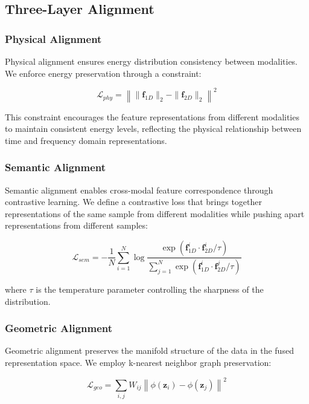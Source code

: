 \documentclass[journal]{IEEEtran}
\begin{document}
\subsection{Three-Layer Alignment}

\subsubsection{Physical Alignment}

Physical alignment ensures energy distribution consistency between modalities. We enforce energy preservation through a constraint:

\begin{equation}
\mathcal{L}_{phy} = \left\| \|\mathbf{f}_{1D}\|_2 - \|\mathbf{f}_{2D}\|_2 \right\|^2
\end{equation}

This constraint encourages the feature representations from different modalities to maintain consistent energy levels, reflecting the physical relationship between time and frequency domain representations.

\subsubsection{Semantic Alignment}

Semantic alignment enables cross-modal feature correspondence through contrastive learning. We define a contrastive loss that brings together representations of the same sample from different modalities while pushing apart representations from different samples:

\begin{equation}
\mathcal{L}_{sem} = -\frac{1}{N} \sum_{i=1}^{N} \log \frac{\exp(\mathbf{f}_{1D}^i \cdot \mathbf{f}_{2D}^i / \tau)}{\sum_{j=1}^{N} \exp(\mathbf{f}_{1D}^i \cdot \mathbf{f}_{2D}^j / \tau)}
\end{equation}

where $\tau$ is the temperature parameter controlling the sharpness of the distribution.

\subsubsection{Geometric Alignment}

Geometric alignment preserves the manifold structure of the data in the fused representation space. We employ k-nearest neighbor graph preservation:

\begin{equation}
\mathcal{L}_{geo} = \sum_{i,j} W_{ij} \left\| \phi(\mathbf{z}_i) - \phi(\mathbf{z}_j) \right\|^2
\end{equation}
\end{document}
